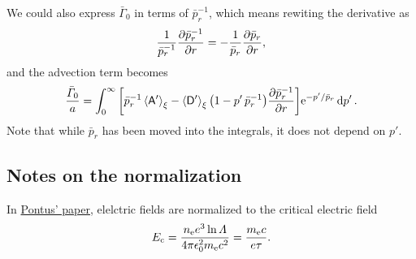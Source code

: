 \documentclass[11pt,a4paper,english
]{article}
\newcommand{\ee}{\mathrm{e}}
\begin{document}
We could also express $\bar{\varGamma}_0$ in terms of
$\bar{p}_{r}^{-1}$, which means rewiting the derivative as 
\begin{equation}
\frac{1}{\bar{p}_r^{-1}}\pdv{\bar{p}_r^{-1}}{r}=-\frac{1}{\bar{p}_r}\pdv{\bar{p}_r}{r},
\end{equation}
and the advection term becomes
\begin{equation}
\frac{\bar\varGamma_{0}}{a} =
\int_{0}^{\infty}\qty[\bar{p}_r^{-1}\ev{\mathsf{A'}}_{\xi} -\ev{\mathsf{D'}}_{\xi}
\qty(1-p'\,\bar{p}_r^{-1})\pdv{\bar{p}_r^{-1}}{r}]
\ee^{-p'/\bar{p}_r}\dd{p'}.
\end{equation}
Note that while $\bar{p}_{r}$ has been moved into the integrals, it
does not depend on $p'$.






\subsection{Notes on the normalization}

In \href{https://arxiv.org/abs/2010.07156}{Pontus' paper}, elelctric fields are normalized to the critical
electric field
\begin{equation}
E_{\rm c} = \frac{n_{\ee}e^3\ln\varLambda}{4\pi\epsilon_0^2m_{\ee}c^2}
= \frac{m_{\ee}c}{e\tau}.
\end{equation}




%




\end{document}
